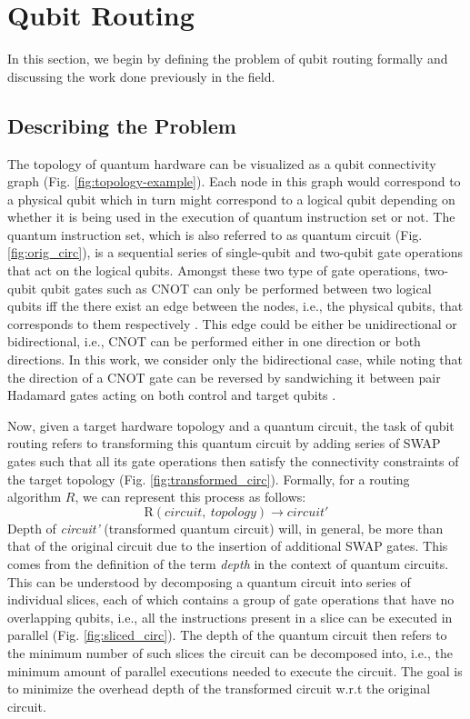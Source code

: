 \documentclass[%
 reprint,
 longbibliography,
 amsmath,amssymb,
 aps,
]{revtex4-2}
\begin{document}
\section{\label{sec:qubit-routing}Qubit Routing}
In this section, we begin by defining the problem of qubit routing formally and discussing the work done previously in the field.

\subsection{\label{sec:intro-defn}Describing the Problem}
The topology of quantum hardware can be visualized as a qubit connectivity graph (Fig. \ref{fig:topology-example}). Each node in this graph would correspond to a physical qubit which in turn might correspond to a logical qubit depending on whether it is being used in the execution of quantum instruction set or not. The quantum instruction set, which is also referred to as quantum circuit (Fig. \ref{fig:orig_circ}), is a sequential series of single-qubit and two-qubit gate operations that act on the logical qubits. Amongst these two type of gate operations, two-qubit qubit gates such as CNOT can only be performed between two logical qubits iff the there exist an edge between the nodes, i.e., the physical qubits, that corresponds to them respectively \citep{qroute_dqn1}. This edge could be either be unidirectional or bidirectional, i.e., CNOT can be performed either in one direction or both directions. In this work, we consider only the bidirectional case, while noting that the direction of a CNOT gate can be reversed by sandwiching it between pair Hadamard gates acting on both control and target qubits \cite{1110.2998}. 

Now, given a target hardware topology and a quantum circuit, the task of qubit routing refers to transforming this quantum circuit by adding series of SWAP gates such that all its gate operations then satisfy the connectivity constraints of the target topology (Fig. \ref{fig:transformed_circ}). Formally, for a routing algorithm $R$, we can represent this process as follows:
\begin{equation}
\textrm{R}(circuit,\ topology) \rightarrow circuit'
\end{equation}
Depth of \textit{circuit'} (transformed quantum circuit) will, in general, be more than that of the original circuit due to the insertion of additional SWAP gates. This comes from the definition of the term \textit{depth} in the context of quantum circuits. This can be understood by decomposing a quantum circuit into series of individual slices, each of which contains a group of gate operations that have no overlapping qubits, i.e., all the instructions present in a slice can be executed in parallel (Fig. \ref{fig:sliced_circ}). The depth of the quantum circuit then refers to the minimum number of such slices the circuit can be decomposed into, i.e., the minimum amount of parallel executions needed to execute the circuit. The goal is to minimize the overhead depth of the transformed circuit w.r.t the original circuit.
\end{document}

